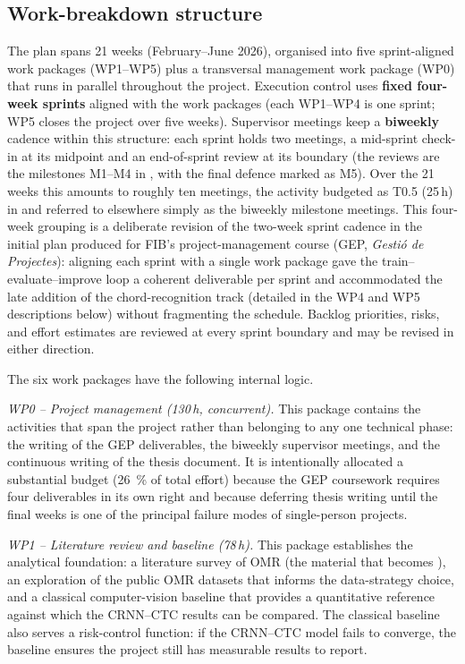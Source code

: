 \subsection{Work-breakdown structure}

The plan spans 21 weeks (February--June 2026), organised into five
sprint-aligned work packages (WP1--WP5) plus a transversal
management work package (WP0) that runs in parallel throughout the
project.
Execution control uses \textbf{fixed four-week sprints} aligned
with the work packages (each WP1--WP4 is one sprint; WP5 closes
the project over five weeks).
Supervisor meetings keep a \textbf{biweekly} cadence within this
structure: each sprint holds two meetings, a mid-sprint check-in at
its midpoint and an end-of-sprint review at its boundary (the
reviews are the milestones M1--M4 in , with the
final defence marked as M5).
Over the 21 weeks this amounts to roughly ten meetings, the activity
budgeted as T0.5 (25\,h) in  and
referred to elsewhere simply as the biweekly milestone meetings.
This four-week grouping is a deliberate revision of the two-week
sprint cadence in the initial plan produced for FIB's project-management
course (GEP, \textit{Gestió de Projectes}): aligning each sprint with a
single work package gave the train--evaluate--improve loop a coherent
deliverable per sprint and accommodated the late addition of the
chord-recognition track (detailed in the WP4 and WP5 descriptions
below) without fragmenting the schedule.
Backlog priorities, risks, and effort estimates are reviewed at
every sprint boundary and may be revised in either direction.

The six work packages have the following internal logic.

\textit{WP0 -- Project management (130\,h, concurrent).}
This package contains the activities that span the project rather
than belonging to any one technical phase: the writing of the GEP
deliverables, the biweekly supervisor meetings, and the
continuous writing of the thesis document.
It is intentionally allocated a substantial budget (\SI{26}{\percent}
of total effort) because the GEP coursework requires four
deliverables in its own right and because deferring thesis
writing until the final weeks is one of the principal failure
modes of single-person projects.

\textit{WP1 -- Literature review and baseline (78\,h).}
This package establishes the analytical foundation: a literature
survey of OMR (the material that becomes ),
an exploration of the public OMR datasets that informs the
data-strategy choice, and a classical computer-vision baseline
that provides a quantitative reference against which the
CRNN--CTC results can be compared.
The classical baseline also serves a risk-control function: if
the CRNN--CTC model fails to converge, the baseline ensures the
project still has measurable results to report.

